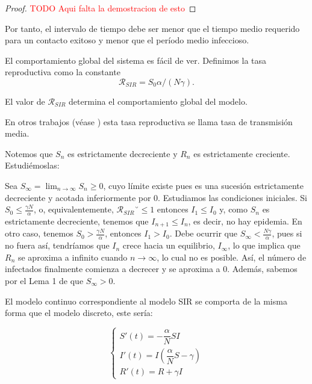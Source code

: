 \begin{proof}
\textcolor{red}{TODO Aqui falta la demostracion de esto}
\end{proof}

Por tanto, el intervalo de tiempo debe ser menor que el tiempo medio requerido para un contacto exitoso y menor que el período medio infeccioso.

El comportamiento global del sistema es fácil de ver. Definimos la tasa reproductiva como la constante 
$$\mathcal{R}_{SIR}=S_0 \alpha/(N\gamma ).$$

El valor de $\mathcal{R}_{SIR}$ determina el comportamiento global del modelo.

En otros trabajos (véase \cite{demongeotSIEpidemicModel}) esta tasa reproductiva se llama tasa de transmisión media.

Notemos que $S_n$ es estrictamente decreciente y $R_n$ es estrictamente creciente. Estudiémoslas:

Sea $S_\infty=\lim_{n\rightarrow\infty} S_n\geq 0$, cuyo límite existe pues es una sucesión estrictamente decreciente y acotada inferiormente por $0$. Estudiamos las condiciones iniciales. Si $S_0\leq \frac{\gamma N}{\alpha}$, o, equivalentemente, $\mathcal{R}_{SIR}˘\leq 1$ entonces $I_1\leq I_0$ y, como $S_n$ es estrictamente decreciente, tenemos que $I_{n+1}\leq I_n$, es decir, no hay epidemia. En otro caso, tenemos $S_0> \frac{\gamma N}{\alpha}$, entonces $I_1>I_0$. Debe ocurrir que $S_\infty <\frac{N\gamma}{\alpha}$, pues si no fuera así, tendríamos que $I_n$ crece hacia un equilibrio, $I_\infty$, lo que implica que $R_n$ se aproxima a infinito cuando $n\rightarrow\infty$, lo cual no es posible. Así, el número de infectados finalmente comienza a decrecer y se aproxima a $0$. Además, sabemos por el Lema 1 de \cite{allenDiscretetimeSISIR1994} que $S_\infty>0$.

El modelo continuo correspondiente al modelo SIR se comporta de la misma forma que el modelo discreto, este sería:

\begin{equation}
\label{eqn: modelo_SIR_continuo}
\begin{cases}
S'(t) = -\dfrac{\alpha}{N}SI \\
I'(t) = I\left(\dfrac{\alpha}{N}S-\gamma \right) \\
R'(t) = R+\gamma I
\end{cases}
\end{equation}


